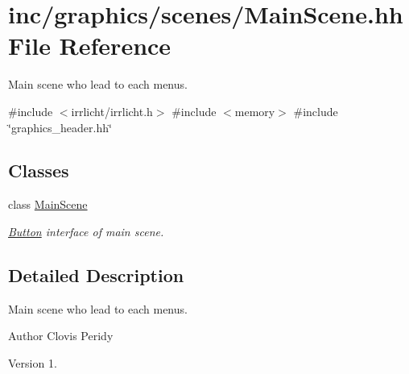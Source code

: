 \hypertarget{MainScene_8hh}{}\section{inc/graphics/scenes/\+Main\+Scene.hh File Reference}
\label{MainScene_8hh}


Main scene who lead to each menus.  


{\ttfamily \#include $<$irrlicht/irrlicht.\+h$>$}\newline
{\ttfamily \#include $<$memory$>$}\newline
{\ttfamily \#include \char`\"{}graphics\+\_\+header.\+hh\char`\"{}}\newline
\subsection*{Classes}
\begin{DoxyCompactItemize}
\item 
class \hyperlink{classMainScene}{Main\+Scene}
\begin{DoxyCompactList}\small\item\em \hyperlink{classButton}{Button} interface of main scene. \end{DoxyCompactList}\end{DoxyCompactItemize}


\subsection{Detailed Description}
Main scene who lead to each menus. 

\begin{DoxyAuthor}{Author}
Clovis Peridy 
\end{DoxyAuthor}
\begin{DoxyVersion}{Version}
1. 
\end{DoxyVersion}
